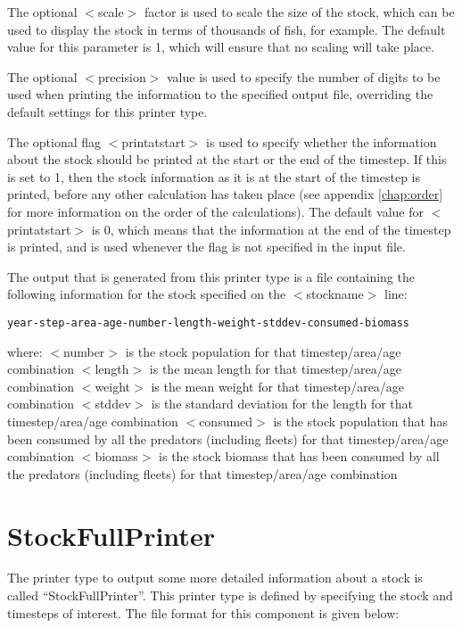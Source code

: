 \documentclass[]{book}
\begin{document}
The optional \(<\)scale\(>\) factor is used to scale the size of the stock,
which can be used to display the stock in terms of thousands of fish,
for example. The default value for this parameter is 1, which will
ensure that no scaling will take place.

The optional \(<\)precision\(>\) value is used to specify the number of
digits to be used when printing the information to the specified output
file, overriding the default settings for this printer type.

The optional flag \(<\)printatstart\(>\) is used to specify whether the
information about the stock should be printed at the start or the end of
the timestep. If this is set to 1, then the stock information as it is
at the start of the timestep is printed, before any other calculation
has taken place (see appendix \ref{chap:order} for more information on the order of the
calculations). The default value for \(<\)printatstart\(>\) is 0, which
means that the information at the end of the timestep is printed, and is
used whenever the flag is not specified in the input file.

The output that is generated from this printer type is a file containing
the following information for the stock specified on the \(<\)stockname\(>\)
line:

\begin{verbatim}
year-step-area-age-number-length-weight-stddev-consumed-biomass
\end{verbatim}

where: \(<\)number\(>\) is the stock population for that timestep/area/age
combination \(<\)length\(>\) is the mean length for that timestep/area/age
combination \(<\)weight\(>\) is the mean weight for that timestep/area/age
combination \(<\)stddev\(>\) is the standard deviation for the length for
that timestep/area/age combination \(<\)consumed\(>\) is the stock
population that has been consumed by all the predators (including
fleets) for that timestep/area/age combination \(<\)biomass\(>\) is the
stock biomass that has been consumed by all the predators (including
fleets) for that timestep/area/age combination

\hypertarget{sec:stockfullprinter}{%
\section{StockFullPrinter}\label{sec:stockfullprinter}}

The printer type to output some more detailed information about a stock
is called ``StockFullPrinter''. This printer type is defined by specifying
the stock and timesteps of interest. The file format for this component
is given below:
\end{document}
